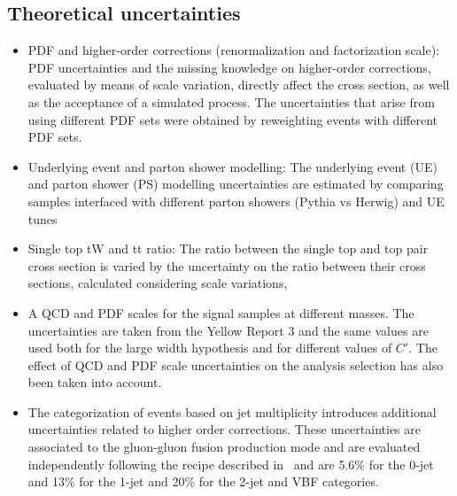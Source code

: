 \subsection*{ Theoretical uncertainties}
\begin{itemize}
\item PDF and higher-order corrections (renormalization and factorization scale): PDF
uncertainties and the missing knowledge on higher-order corrections, evaluated by
means of scale variation, directly affect the cross section, as well as the acceptance
of a simulated process. The uncertainties that arise from using different PDF sets
were obtained by reweighting events with different PDF sets.

\item Underlying event and parton shower modelling: The underlying event (UE) and
parton shower (PS) modelling uncertainties are estimated by comparing samples
interfaced with different parton showers (Pythia vs Herwig) and UE tunes

\item Single top tW and tt ratio: The ratio between the single top and top pair cross section
is varied by the uncertainty on the ratio between their cross sections, calculated considering scale variations,

\item A QCD and PDF scales for the signal samples at different masses. The uncertainties are taken from the Yellow Report 3 and the same values are used both for the large width hypothesis and for different values of $C'$. The effect of QCD and PDF scale uncertainties on the analysis selection has also been taken into account.

\item The categorization of events based on jet multiplicity introduces additional uncertainties related to higher order corrections. These uncertainties are associated to the gluon-gluon fusion production mode and are evaluated independently following the recipe described in~\cite{Boughezal:2013oha} and are 5.6\% for the 0-jet and  13\% for the 1-jet and 20\% for the 2-jet and VBF categories.




\end{itemize}



